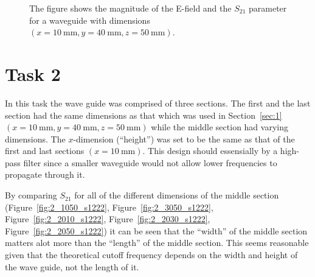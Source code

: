 \documentclass[12pt,a4paper]{article}
\begin{document}
\begin{figure}
\begin{subfigure}[b]{0.49\textwidth}
    \label{fig:1_s1222}
  \end{subfigure}
  \caption{The figure shows the magnitude of the E-field and the $S_{21}$ parameter for a waveguide with dimensions $(x=\SI{10}{\milli\metre}, y=\SI{40}{\milli\metre}, z=\SI{50}{\milli\metre})$.}
  \label{fig:task1}
\end{figure}

\section{Task 2}\label{sec:2}
In this task the wave guide was comprised of three sections. The first and the last section had the same dimensions as that which was used in Section~\ref{sec:1} $(x=\SI{10}{\milli\metre}, y=\SI{40}{\milli\metre}, z=\SI{50}{\milli\metre})$ while the middle section had varying dimensions. The $x$-dimension (``height'') was set to be the same as that of the first and last sections $(x=\SI{10}{\milli\metre})$. This design should essensially by a high-pass filter since a smaller waveguide would not allow lower frequencies to propagate through it.

By comparing $S_{21}$ for all of the different dimensions of the middle section (Figure~\ref{fig:2_1050_s1222}, Figure~\ref{fig:2_3050_s1222}, Figure~\ref{fig:2_2010_s1222}, Figure~\ref{fig:2_2030_s1222}, Figure~\ref{fig:2_2050_s1222}) it can be seen that the ``width'' of the middle section matters alot more than the ``length'' of the middle section. This seems reasonable given that the theoretical cutoff frequency depends on the width and height of the wave guide, not the length of it.
\end{document}
